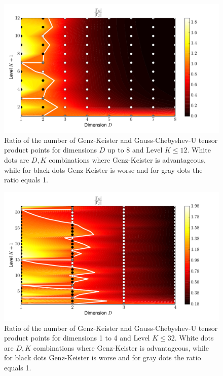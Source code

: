 \documentclass[a4paper,10pt]{article}
\begin{document}
\begin{figure}[h]
  \centering
  \includegraphics[width=0.8\linewidth]{./img/gk_chebyshevu_ratio.pdf}
  \caption{Ratio of the number of Genz-Keister and Gauss-Chebyshev-U tensor product
  points for dimensions $D$ up to 8 and Level $K \leq 12$. White dots are $D,K$
  combinations where Genz-Keister is advantageous, while for black dots
  Genz-Keister is worse and for gray dots the ratio equals 1.}
  \label{fig:gk_chebyshevu_ratio}
\end{figure}

\begin{figure}[h]
  \centering
  \includegraphics[width=0.8\linewidth]{./img/gk_chebyshevu_ratio_large.pdf}
  \caption{Ratio of the number of Genz-Keister and Gauss-Chebyshev-U tensor product
  points for dimensions 1 to 4 and Level $K \leq 32$. White dots are $D,K$
  combinations where Genz-Keister is advantageous, while for black dots
  Genz-Keister is worse and for gray dots the ratio equals 1.}
  \label{fig:gk_chebyshevu_ratio_large}
\end{figure}
\end{document}

